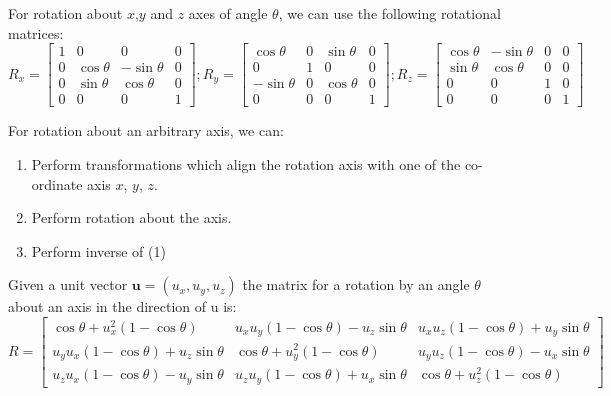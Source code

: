\documentclass[12pt]{article}
\begin{document}
	For rotation about $x$,$y$ and $z$ axes of angle $\theta$, we can use the following rotational matrices: 
	$$
	R_x = \begin{bmatrix}
	1 & 0 & 0 & 0 \\
	0 & \cos \theta & -\sin \theta & 0 \\
	0 & \sin \theta & \cos \theta & 0 \\
	0 & 0 & 0 & 1  
	\end{bmatrix} ; 
	R_y = \begin{bmatrix}
	\cos \theta & 0 & \sin \theta & 0 \\
	0 & 1 & 0 & 0 \\
	-\sin \theta & 0 & \cos \theta & 0 \\
	0 & 0 & 0 & 1  
	\end{bmatrix} ; 
	R_z = \begin{bmatrix}
	\cos \theta & -\sin \theta & 0 & 0 \\
	\sin \theta & \cos \theta & 0 & 0 \\
	0 & 0 & 1 & 0 \\	
	0 & 0 & 0 & 1  
	\end{bmatrix}
	$$
	
	For rotation about an arbitrary axis, we can:
	\begin{enumerate}
	    \item Perform transformations which align the rotation axis with one of the co-ordinate axis $x$, $y$, $z$.
	    \item Perform rotation about the axis.
	    \item Perform inverse of (1)
	\end{enumerate}
	
	Given a unit vector $\textbf{u} = (u_x, u_y, u_z) $  the matrix for a rotation by an angle $\theta$ about an axis in the direction of u is:
	$${\displaystyle R={\begin{bmatrix}\cos \theta +u_{x}^{2}\left(1-\cos \theta \right)&u_{x}u_{y}\left(1-\cos \theta \right)-u_{z}\sin \theta &u_{x}u_{z}\left(1-\cos \theta \right)+u_{y}\sin \theta \\u_{y}u_{x}\left(1-\cos \theta \right)+u_{z}\sin \theta &\cos \theta +u_{y}^{2}\left(1-\cos \theta \right)&u_{y}u_{z}\left(1-\cos \theta \right)-u_{x}\sin \theta \\u_{z}u_{x}\left(1-\cos \theta \right)-u_{y}\sin \theta &u_{z}u_{y}\left(1-\cos \theta \right)+u_{x}\sin \theta &\cos \theta +u_{z}^{2}\left(1-\cos \theta \right)\end{bmatrix}}}$$
	
\end{document}
